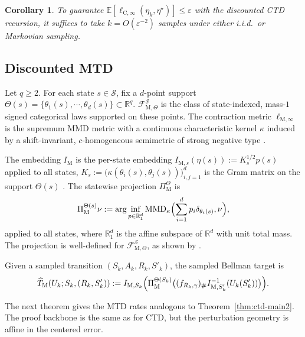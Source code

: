 \documentclass{article}
\newtheorem{corollary}[theorem]{Corollary}
\newcommand{\X}{\mathcal{S}}
\begin{document}
\begin{corollary}\label{cor:disc-ctd}
To guarantee
$\mathbb{E}[\ell_{\mathrm C,\infty}(\eta_k,\eta^\star)] \le \varepsilon$ with the discounted CTD recursion, it suffices to take $k = O(\varepsilon^{-2})$ samples under either i.i.d.\ or Markovian sampling.
\end{corollary}

\subsection{Discounted MTD}\label{sec:mtd-new2}
Let $q \ge 2$. For each state $s\in\X$, fix a $d$-point support $\Theta(s)=\{\theta_1(s),\cdots,\theta_d(s)\}\subset\mathbb R^q$. $\mathcal F^{\X}_{\mathrm M,\Theta}$ is the class of state-indexed, mass-$1$ signed categorical laws supported on these points. The contraction metric $\ell_{\mathrm M, \infty}$ is the supremum MMD metric with a continuous characteristic kernel $\kappa$ induced by a shift-invariant, $c$-homogeneous semimetric of strong negative type \citep{smola2007hilbert,gretton2012kernel,muandet2017kernel,wiltzer2024foundations}.

The embedding $I_{\mathrm M}$ is the per-state embedding $I_{\mathrm M, s}(\eta(s)):=K_s^{1/2}p(s)$ applied to all states, $K_s:=\bigl(\kappa(\theta_i(s),\theta_j(s))\bigr)_{i,j=1}^d$ is the Gram matrix on the support $\Theta(s)$ \citep{wiltzer2024foundations}. The statewise projection $\Pi_{\mathrm M}^{\Theta}$ is
\begin{equation}
\Pi^{\Theta(s)}_{\mathrm M}\nu := \arg\inf_{p\in\mathbb R_1^d} \mathrm{MMD}_{\kappa}\Bigl(\sum_{i=1}^d p_i\delta_{\theta_i(s)},\nu\Bigr),
\end{equation}
applied to all states, where $\mathbb R_1^d$ is the affine subspace of $\mathbb{R}^d$ with unit total mass. The projection is well-defined for $\mathcal F^\X_{\mathrm M,\Theta}$, as shown by \citet{wiltzer2024foundations}.

Given a sampled transition $(S_k,A_k,R_k,S'_k)$, the sampled Bellman target is
\begin{equation}
\widehat T_{\mathrm M}(U_k;S_k,(R_k,S'_k)) := I_{\mathrm M, S_k}\Bigl(\Pi_{\mathrm M}^{\Theta(S_k)}\bigl((f_{R_k,\gamma})_\# I_{\mathrm M, S'_k}^{-1}(U_k(S'_k))\bigr)\Bigr).
\end{equation}

The next theorem gives the MTD rates analogous to Theorem~\ref{thm:ctd-main2}. The proof backbone is the same as for CTD, but the perturbation geometry is affine in the centered error.
\end{document}
